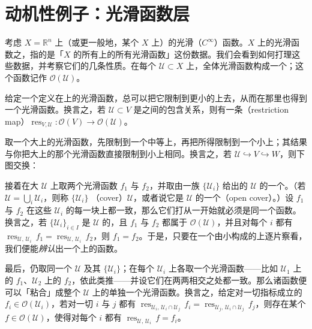 
\section{动机性例子：光滑函数层}

考虑\trTopologicalSpace{} $X=\mathbb{R}^n$ 上（或更一般地，某个\trManifold{} $X$ 上）的光滑（$C^\infty$）函数。$X$ 上的光滑函数之\trSheaf，指的是「$X$ 的所有\trOpenSubset{}上的所有光滑函数」这份数据。我们会看到如何打理这些数据，并考察它们的几条性质。在每个\trOpenSet{} $\mathcal{U}\subset X$ 上，全体光滑函数构成一个\trRing；这个函数\trRing{}记作 $\mathscr{O}(\mathcal{U})$。

给定一个定义在\trOpenSet{}上的光滑函数，总可以把它限制到更小的\trOpenSet{}上去，从而在那里也得到一个光滑函数。换言之，若 $\mathcal{U}\subset V$ 是\trOpenSet{}之间的包含关系，则有一条\textbf{\trRestrictionMap}（restriction map）$\operatorname{res}_{V,\mathcal{U}}\colon\mathscr{O}(V)\to\mathscr{O}(\mathcal{U})$。

取一个大\trOpenSet{}上的光滑函数，先限制到一个中等\trOpenSet{}上，再把所得限制到一个小\trOpenSet{}上；其结果与你把大\trOpenSet{}上的那个光滑函数直接限制到小\trOpenSet{}上相同。换言之，若 $\mathcal{U}\hookrightarrow V\hookrightarrow W$，则下图交换：
\begin{center}
\end{center}

接着在大\trOpenSet{} $\mathcal{U}$ 上取两个光滑函数 $f_1$ 与 $f_2$，并取由一族\trOpenSubset{} $\{\mathcal{U}_i\}$ 给出的 $\mathcal{U}$ 的一个\trOpenCover。（若 $\mathcal{U}=\bigcup_i\mathcal{U}_i$，则称 $\{\mathcal{U}_i\}$ \textbf{\trCover}（cover）$\mathcal{U}$，或者说它是 $\mathcal{U}$ 的一个\textbf{\trOpenCover}（open cover）。）设 $f_1$ 与 $f_2$ 在这些 $\mathcal{U}_i$ 的每一块上都一致，那么它们打从一开始就必须是同一个函数。换言之，若 $\{\mathcal{U}_i\}_{i\in I}$ 是 $\mathcal{U}$ 的\trCover，且 $f_1$ 与 $f_2$ 都属于 $\mathscr{O}(\mathcal{U})$，并且对每个 $i$ 都有 $\operatorname{res}_{\mathcal{U},\,\mathcal{U}_i}\,f_1=\operatorname{res}_{\mathcal{U},\,\mathcal{U}_i}\,f_2$，则 $f_1=f_2$。于是，只要在一个由小\trOpenSet{}构成的\trCover{}上逐片察看，我们便能\emph{辨认}出一个\trOpenSet{}上的函数。

最后，仍取同一个 $\mathcal{U}$ 及其\trCover{} $\{\mathcal{U}_i\}$；在每个 $\mathcal{U}_i$ 上各取一个光滑函数——比如 $\mathcal{U}_1$ 上的 $f_1$、$\mathcal{U}_2$ 上的 $f_2$，依此类推——并设它们在两两相交之处都一致。那么诸函数便可以「粘合」成整个 $\mathcal{U}$ 上的单独一个光滑函数。换言之，给定对一切指标成立的 $f_i\in\mathscr{O}(\mathcal{U}_i)$，若对一切 $i$ 与 $j$ 都有 $\operatorname{res}_{\mathcal{U}_i,\,\mathcal{U}_i\cap\mathcal{U}_j}\,f_i=\operatorname{res}_{\mathcal{U}_j,\,\mathcal{U}_i\cap\mathcal{U}_j}\,f_j$，则存在某个 $f\in\mathscr{O}(\mathcal{U})$，使得对每个 $i$ 都有 $\operatorname{res}_{\mathcal{U},\,\mathcal{U}_i}\,f=f_i$。

